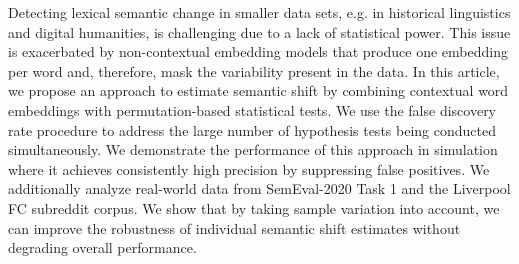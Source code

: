 Detecting lexical semantic change in smaller data sets, e.g. in historical linguistics and digital humanities, is challenging due to a lack of statistical power. This issue is exacerbated by non-contextual embedding models that produce one embedding per word and, therefore, mask the variability present in the data. In this article, we propose an approach to estimate semantic shift by combining contextual word embeddings with permutation-based statistical tests. We use the false discovery rate procedure to address the large number of hypothesis tests being conducted simultaneously. We demonstrate the performance of this approach in simulation where it achieves consistently high precision by suppressing false positives. We additionally analyze real-world data from SemEval-2020 Task 1 and the Liverpool FC subreddit corpus. We show that by taking sample variation into account, we can improve the robustness of individual semantic shift estimates without degrading overall performance.
